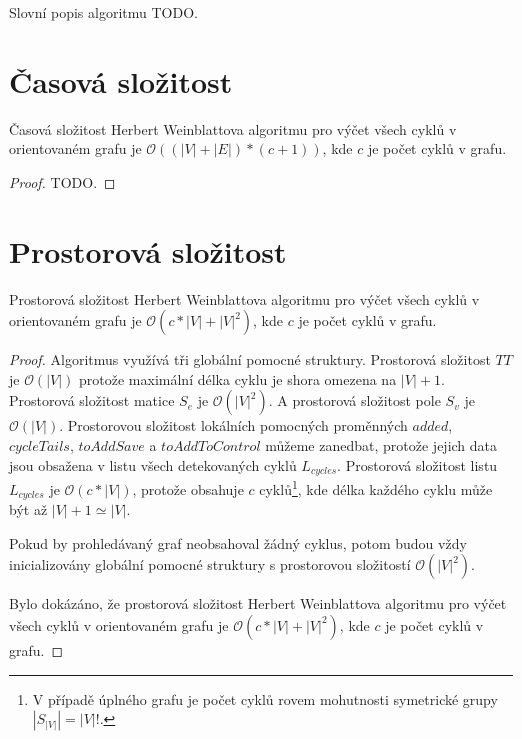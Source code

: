         Slovní popis algoritmu TODO.

    \section{Časová složitost}
        \begin{theorem}
            Časová složitost Herbert Weinblattova algoritmu pro výčet všech cyklů v orientovaném grafu je $\mathcal{O}((|V| + |E|)*(c + 1))$, kde $c$ je počet cyklů v grafu.
        \end{theorem}

        \begin{proof}
            TODO.
        \end{proof}

    \section{Prostorová složitost}
        \begin{theorem}
            Prostorová složitost Herbert Weinblattova algoritmu pro výčet všech cyklů v orientovaném grafu je $\mathcal{O}(c * |V| + |V|^2)$, kde $c$ je počet cyklů v grafu.
        \end{theorem}

        \begin{proof}
            Algoritmus využívá tři globální pomocné struktury. Prostorová složitost $TT$ je $\mathcal{O}(|V|)$ protože maximální délka cyklu je shora omezena na $|V| + 1$. Prostorová složitost matice $S_e$ je $\mathcal{O}(|V|^2)$. A prostorová složitost pole $S_v$ je $\mathcal{O}(|V|)$. Prostorovou složitost lokálních pomocných proměnných $added$, $cycleTails$, $toAddSave$ a $toAddToControl$ můžeme zanedbat, protože jejich data jsou obsažena v listu všech detekovaných cyklů $L_{cycles}$. Prostorová složitost listu $L_{cycles}$ je $\mathcal{O}(c * |V|)$, protože obsahuje $c$ cyklů\footnote{V případě úplného grafu je počet cyklů rovem mohutnosti symetrické grupy $|S_{|V|}| = |V|!$.}, kde délka každého cyklu může být až $|V| + 1 \simeq |V|$.

            Pokud by prohledávaný graf neobsahoval žádný cyklus, potom budou vždy inicializovány globální pomocné struktury s prostorovou složitostí $\mathcal{O}(|V|^2)$.

            Bylo dokázáno, že prostorová složitost Herbert Weinblattova algoritmu pro výčet všech cyklů v orientovaném grafu je $\mathcal{O}(c * |V| + |V|^2)$, kde $c$ je počet cyklů v grafu.
        \end{proof}

